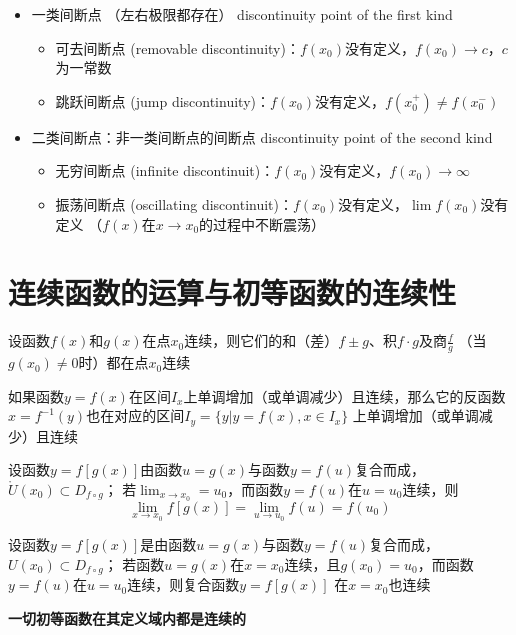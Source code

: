 \documentclass[UTF8]{ctexart}
\begin{document}
\bigskip

\begin{itemize}
  \item 一类间断点 （左右极限都存在） discontinuity point of the first kind
  \begin{itemize}
    \item 可去间断点 (removable discontinuity)：$f(x_0)$没有定义，$f(x_0)\to c$，$c$为一常数
    \item 跳跃间断点 (jump discontinuity)：$f(x_0)$没有定义，$f(x_0^+)\ne f(x_0^-)$
  \end{itemize}
  \item 二类间断点：非一类间断点的间断点 discontinuity point of the second kind
  \begin{itemize}
    \item 无穷间断点 (infinite discontinuit)：$f(x_0)$没有定义，$f(x_0)\to\infty$
    \item 振荡间断点 (oscillating discontinuit)：$f(x_0)$没有定义，$\lim f(x_0)$没有定义 （$f(x)$在$x\to x_0$的过程中不断震荡）
  \end{itemize}
\end{itemize}
\bigskip
\bigskip
\section*{连续函数的运算与初等函数的连续性}

\bigskip

设函数$f(x)$和$g(x)$在点$x_0$连续，则它们的和（差）$f\pm g$、积$f\cdot g$及商$\frac{f}{g}$
（当$g(x_0)\ne0$时）都在点$x_0$连续

\bigskip

如果函数$y=f(x)$在区间$I_x$上单调增加（或单调减少）且连续，那么它的反函数$x=f^{-1}(y)$也在对应的区间$I_y=\{y|y=f(x),x\in I_x\}$
上单调增加（或单调减少）且连续

\bigskip

设函数$y=f[g(x)]$由函数$u=g(x)$与函数$y=f(u)$复合而成，$\mathring{U}(x_0)\subset D_{f\circ g}$；
若$\lim_{x\to x_0}=u_0$，而函数$y=f(u)$在$u=u_0$连续，则
\[ \lim_{x\to x_0}f[g(x)]=\lim_{u\to u_0}f(u)=f(u_0) \]

\bigskip

设函数$y=f[g(x)]$是由函数$u=g(x)$与函数$y=f(u)$复合而成，$U(x_0)\subset D_{f\circ g}$；
若函数$u=g(x)$在$x=x_0$连续，且$g(x_0)=u_0$，而函数$y=f(u)$在$u=u_0$连续，则复合函数$y=f[g(x)]$
在$x=x_0$也连续

\bigskip

\textbf{一切初等函数在其定义域内都是连续的}
\bigskip
\bigskip
\end{document}
